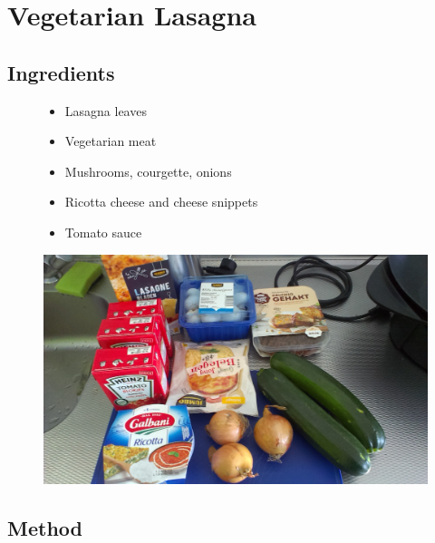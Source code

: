 \documentclass[a4paper,12pt]{report}
\begin{document}
\chapter{Vegetarian Lasagna}


\section*{Ingredients}
\begin{figure}[h]

\begin{minipage}{0.65\textwidth}
\begin{itemize}
\item Lasagna leaves
\item Vegetarian meat 
\item Mushrooms, courgette, onions
\item Ricotta cheese and cheese snippets
\item Tomato sauce
\end{itemize}
\end{minipage}
\begin{minipage}{0.3\textwidth}
	\includegraphics[scale=0.07]{Images/las.jpg}
\end{minipage}
\end{figure}


\section*{Method}
\end{document}

